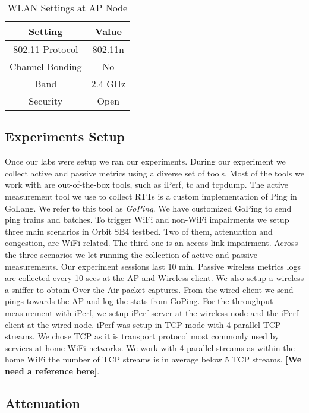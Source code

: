 \begin{table}[h]
	\begin{center}
		\begin{tabular}{||c c||}
			\hline
			Setting & Value\\ [0.5ex] 
			\hline\hline
			802.11 Protocol & 802.11n\\ 
			\hline
			Channel Bonding & No\\
			\hline
			Band & 2.4 GHz\\
			\hline
			Security & Open\\ [1ex] 
			\hline
		\end{tabular}
	\end{center}
	\caption{WLAN Settings at AP Node}
	\label{table:WLAN_Settings_AP_Node}
\end{table} 


\subsection{Experiments Setup}\label{Experiments_setup}

Once our labs were setup we ran our experiments. During our experiment we collect active and passive metrics using a diverse set of tools. Most of the tools we work with are out-of-the-box tools, such as iPerf, tc and tcpdump. The active measurement tool we use to collect RTTs is a custom implementation of Ping in GoLang. We refer to this tool as \emph{GoPing}. We have customized GoPing to send ping trains and batches.
To trigger WiFi and non-WiFi impairments we setup three main scenarios in Orbit SB4 testbed. Two of them, attenuation and congestion, are WiFi-related. The third one is an access link impairment. Across the three scenarios we let running the collection of active and passive measurements. Our experiment sessions last 10 min. Passive wireless metrics logs are collected every 10 secs at the AP and Wireless client. We also setup a wireless a sniffer to obtain Over-the-Air packet captures. From the wired client we send pings towards the AP and log the stats from GoPing. For the throughput measurement with iPerf, we setup iPerf server at the wireless node and the iPerf client at the wired node. iPerf was setup in TCP mode with 4 parallel TCP streams. We chose TCP as it is transport protocol most commonly used by services at home WiFi networks. We work with 4 parallel streams as within the home WiFi the number of TCP streams is in average below 5 TCP streams. \textbf{[We need a reference here]}.

\subsection*{Attenuation}\label{attenuation}

